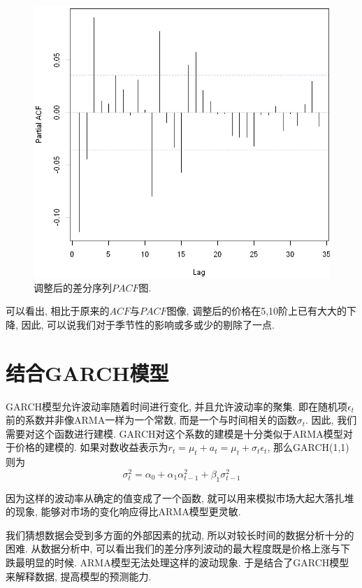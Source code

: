 \documentclass[11pt]{article}
\begin{document}
\begin{center}
\begin{minipage}{0.45\textwidth}
\begin{figure}
            \hspace{-25pt}\includegraphics[width=.9\textwidth]{output_30_1}
            \caption{调整后的差分序列$PACF$图.\label{fig:12}}
        \end{figure}
    \end{minipage}
\end{center}

\qquad 可以看出, 相比于原来的$ACF$与$PACF$图像, 调整后的价格在5,10阶上已有大大的下降, 因此, 可以说我们对于季节性的影响或多或少的剔除了一点. 
\section{结合GARCH模型}
\qquad GARCH模型允许波动率随着时间进行变化, 并且允许波动率的聚集. 即在随机项$\epsilon_t$前的系数并非像ARMA一样为一个常数, 而是一个与时间相关的函数$\sigma_t$. 因此, 我们需要对这个函数进行建模. GARCH对这个系数的建模是十分类似于ARMA模型对于价格的建模的. 如果对数收益表示为$r_t=\mu_t+a_t=\mu_t+\sigma_t\epsilon_t$, 那么GARCH(1,1)则为
\begin{equation*}
\sigma_t^2=\alpha_0+\alpha_1\alpha_{t-1}^2+\beta_1\sigma^2_{t-1}
\end{equation*}

\qquad 因为这样的波动率从确定的值变成了一个函数, 就可以用来模拟市场大起大落扎堆的现象, 能够对市场的变化响应得比ARMA模型更灵敏.

\qquad 我们猜想数据会受到多方面的外部因素的扰动, 所以对较长时间的数据分析十分的困难. 从数据分析中, 可以看出我们的差分序列波动的最大程度既是价格上涨与下跌最明显的时候. ARMA模型无法处理这样的波动现象. 于是结合了GARCH模型来解释数据, 提高模型的预测能力. 
\end{document}
